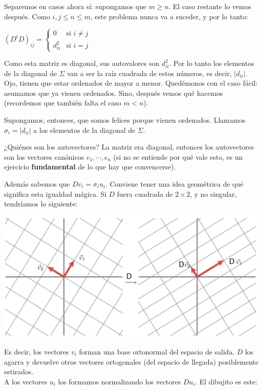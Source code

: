 \documentclass[10pt,a4paper,final]{article}
\begin{document}
Separemos en casos ahora sí: supongamos que $m \geq n$. El caso restante lo vemos después. Como $i,j \leq n \leq m$, este problema nunca va a suceder, y por lo tanto:


$(D^t D)_{ij} =
    \begin{cases}
        0 & \text{si $i\neq j$} \\
       d_{ii}^2 & \text{si $i=j$}
    \end{cases}$

Como esta matriz es diagonal, sus autovalores son $d_{ii}^2$. Por lo tanto los elementos de la diagonal de $\Sigma$ van a ser la raíz cuadrada de estos números, es decir, $|d_{ii}|$. Ojo, tienen que estar ordenados de mayor a menor. Quedémonos con el caso fácil: asumamos que ya vienen ordenados. Sino, después vemos qué hacemos (recordemos que también falta el caso $m<n$).

Supongamos, entonces, que somos felices porque vienen ordenados. Llamamos $\sigma_i = |d_{ii}|$ a los elementos de la diagonal de $\Sigma$.

¿Quiénes son los autovectores? La matriz era diagonal, entonces los autovectores son los vectores canónicos $e_1,\cdots, e_n$ (si no se entiende por qué vale esto, es un ejercicio \textbf{fundamental} de lo que hay que convencerse).

Además sabemos que $D v_i = \sigma_i u_i$. Conviene tener una idea geométrica de qué significa esta igualdad mágica. Si $D$ fuera cuadrada de $2\times2$, y no singular, tendríamos lo siguiente:

\includegraphics{SVD.png}

Es decir, los vectores $v_i$ forman una base ortonormal del espacio de salida. $D$ los agarra y devuelve otros vectores ortogonales (del espacio de llegada) posiblemente estirados. \\
A los vectores $u_i$ los formamos normalizando los vectores $D u_i$. El dibujito es este:
\end{document}
